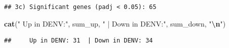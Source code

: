 \documentclass[
]{article}
\newenvironment{Shaded}{\begin{snugshade}}{\end{snugshade}}
\newcommand{\FunctionTok}[1]{\textcolor[rgb]{0.13,0.29,0.53}{\textbf{#1}}}
\newcommand{\NormalTok}[1]{#1}
\newcommand{\SpecialCharTok}[1]{\textcolor[rgb]{0.81,0.36,0.00}{\textbf{#1}}}
\newcommand{\StringTok}[1]{\textcolor[rgb]{0.31,0.60,0.02}{#1}}
\begin{document}
\begin{verbatim}
## 3c) Significant genes (padj < 0.05): 65
\end{verbatim}

\begin{Shaded}
\begin{Highlighting}[]
\FunctionTok{cat}\NormalTok{(}\StringTok{"    Up in DENV:"}\NormalTok{, sum\_up, }\StringTok{" | Down in DENV:"}\NormalTok{, sum\_down, }\StringTok{"}\SpecialCharTok{\textbackslash{}n}\StringTok{"}\NormalTok{)}
\end{Highlighting}
\end{Shaded}

\begin{verbatim}
##     Up in DENV: 31  | Down in DENV: 34
\end{verbatim}
\end{document}
